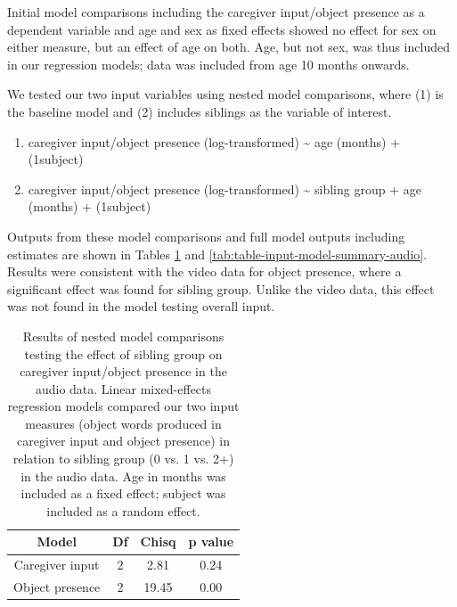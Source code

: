 \documentclass[
  man,mask,floatsintext]{apa6}
\providecommand{\tightlist}{%
  \setlength{\itemsep}{0pt}\setlength{\parskip}{0pt}}
\begin{document}
Initial model comparisons including the caregiver input/object presence as a dependent variable and age and sex as fixed effects showed no effect for sex on either measure, but an effect of age on both. Age, but not sex, was thus included in our regression models; data was included from age 10 months onwards.

We tested our two input variables using nested model comparisons, where (1) is the baseline model and (2) includes siblings as the variable of interest.

\begin{enumerate}
\def\labelenumi{\arabic{enumi}.}
\tightlist
\item
  caregiver input/object presence (log-transformed) \textasciitilde{} age (months) + (1\textbar subject)
\item
  caregiver input/object presence (log-transformed) \textasciitilde{} sibling group + age (months) + (1\textbar subject)
\end{enumerate}

Outputs from these model comparisons and full model outputs including estimates are shown in Tables \ref{tab:table-model-comparisons-audio} and \ref{tab:table-input-model-summary-audio}. Results were consistent with the video data for object presence, where a significant effect was found for sibling group. Unlike the video data, this effect was not found in the model testing overall input.

\begin{longtable}[t]{cccc}
\caption{\label{tab:table-model-comparisons-audio}Results of nested model comparisons testing the effect of sibling group on caregiver input/object presence in the audio data. Linear mixed-effects regression models compared our two input measures (object words produced in caregiver input  and object presence) in relation to sibling group (0 vs. 1 vs. 2+) in the audio data. Age in months was included as a fixed effect; subject was included as a random effect.}\\
\toprule
Model & Df & Chisq & p value\\
\midrule
Caregiver input & 2 & 2.81 & 0.24\\
Object presence & 2 & 19.45 & 0.00\\
\bottomrule
\end{longtable}
\end{document}
